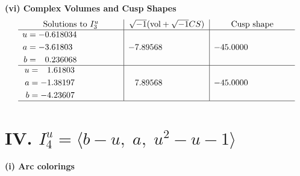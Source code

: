 \documentclass[1p]{elsarticle_modified}
\theoremstyle{definition}
\newcommand{\I}{\sqrt{-1}}
\begin{document}
\newpage\flushleft \textbf{(vi) Complex Volumes and Cusp Shapes}
$$\begin{array}{c|c|c}  
\text{Solutions to }I^u_{3}& \I (\text{vol} + \sqrt{-1}CS) & \text{Cusp shape}\\
 \hline 
\begin{aligned}
u &= -0.618034\phantom{ +0.000000I} \\
a &= -3.61803\phantom{ +0.000000I} \\
b &= \phantom{-}0.236068\phantom{ +0.000000I}\end{aligned}
 & -7.89568\phantom{ +0.000000I} & -45.0000\phantom{ +0.000000I} \\ \hline\begin{aligned}
u &= \phantom{-}1.61803\phantom{ +0.000000I} \\
a &= -1.38197\phantom{ +0.000000I} \\
b &= -4.23607\phantom{ +0.000000I}\end{aligned}
 & \phantom{-}7.89568\phantom{ +0.000000I} & -45.0000\phantom{ +0.000000I}\\
 \hline 
 \end{array}$$\newpage\newpage\renewcommand{\arraystretch}{1}
\centering \section*{IV. $I^u_{4}= \langle b- u,\;a,\;u^2- u-1 \rangle$}
\flushleft \textbf{(i) Arc colorings}\\
\end{document}
